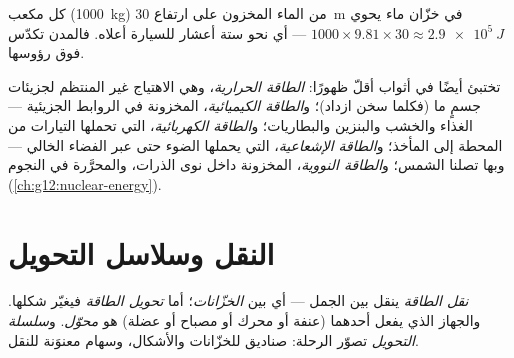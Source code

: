 \begin{example}[خزّان الماء]\label{ex:g10:energy-conservation:potential}
كل  مكعب (\qty{1000}{kg}) من الماء المخزون على ارتفاع \qty{30}{m} في
خزّان ماء يحوي $1000 \times 9.81 \times 30 \approx \qty{2.9e5}{J}$
--- أي نحو ستة أعشار  للسيارة أعلاه. فالمدن
تكدّس  فوق رؤوسها.
\end{example}

\begin{definition}\label{def:g10:energy-conservation:forms}
تختبئ  أيضًا في أثواب أقلّ ظهورًا: \emph{الطاقة
الحرارية}، وهي الاهتياج غير المنتظم لجزيئات
جسمٍ ما (فكلما سخن ازداد)؛ و\emph{الطاقة
الكيميائية}، المخزونة في الروابط الجزيئية --- الغذاء
والخشب والبنزين والبطاريات؛ و\emph{الطاقة
الكهربائية}، التي تحملها التيارات من المحطة إلى
المأخذ؛ و\emph{الطاقة الإشعاعية}، التي يحملها
الضوء حتى عبر الفضاء الخالي --- وبها تصلنا  الشمس؛
و\emph{الطاقة النووية}، المخزونة داخل نوى
الذرات، والمحرَّرة في النجوم (\cref{ch:g12:nuclear-energy}).
\end{definition}

\section{النقل وسلاسل التحويل}

\begin{definition}\label{def:g10:energy-conservation:transfer}
\emph{نقل الطاقة} ينقل 
بين الجمل --- أي بين \emph{الخزّانات}؛
أما \emph{تحويل الطاقة} فيغيّر
شكلها. والجهاز الذي يفعل أحدهما (عنفة أو محرك أو مصباح أو عضلة) هو
\emph{محوّل}. و\emph{سلسلة
التحويل} تصوّر الرحلة: صناديق
للخزّانات والأشكال، وسهام معنوَنة للنقل.
\end{definition}

